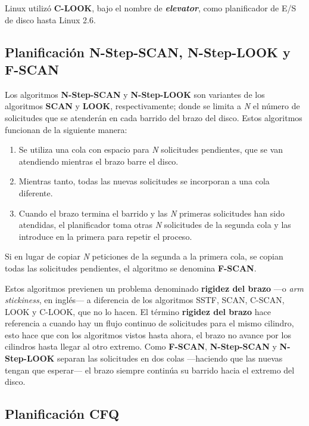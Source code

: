Linux utilizó \textbf{C-LOOK}, bajo el nombre de
\textbf{\emph{elevator}}, como planificador de E/S de disco hasta Linux
2.6.

\subsection{Planificación N-Step-SCAN, N-Step-LOOK y
F-SCAN}\label{_planificaciuxf3n_n_step_scan_n_step_look_y_f_scan}

{} {} {} Los algoritmos \textbf{{}N-Step-SCAN} y \textbf{{}N-Step-LOOK}
son variantes de los algoritmos \textbf{SCAN} y \textbf{LOOK},
respectivamente; donde se limita a \emph{N} el número de solicitudes que
se atenderán en cada barrido del brazo del disco. Estos algoritmos
funcionan de la siguiente manera:

\begin{enumerate}
\def\labelenumi{\arabic{enumi}.}
\item
  Se utiliza una cola con espacio para \emph{N} solicitudes pendientes,
  que se van atendiendo mientras el brazo barre el disco.
\item
  Mientras tanto, todas las nuevas solicitudes se incorporan a una cola
  diferente.
\item
  Cuando el brazo termina el barrido y las \emph{N} primeras solicitudes
  han sido atendidas, el planificador toma otras \emph{N} solicitudes de
  la segunda cola y las introduce en la primera para repetir el proceso.
\end{enumerate}

Si en lugar de copiar \emph{N} peticiones de la segunda a la primera
cola, se copian todas las solicitudes pendientes, el algoritmo se
denomina \textbf{{}F-SCAN}.

Estos algoritmos previenen un problema denominado \textbf{{}rigidez del
brazo} ---o \emph{arm stickiness}, en inglés--- a diferencia de los
algoritmos SSTF, SCAN, C-SCAN, LOOK y C-LOOK, que no lo hacen. El
término \textbf{rigidez del brazo} hace referencia a cuando hay un flujo
continuo de solicitudes para el mismo cilindro, esto hace que con los
algoritmos vistos hasta ahora, el brazo no avance por los cilindros
hasta llegar al otro extremo. Como \textbf{F-SCAN}, \textbf{N-Step-SCAN}
y \textbf{N-Step-LOOK} separan las solicitudes en dos colas ---haciendo
que las nuevas tengan que esperar--- el brazo siempre continúa su
barrido hacia el extremo del disco.

\subsection{Planificación CFQ}\label{_planificaciuxf3n_cfq}

